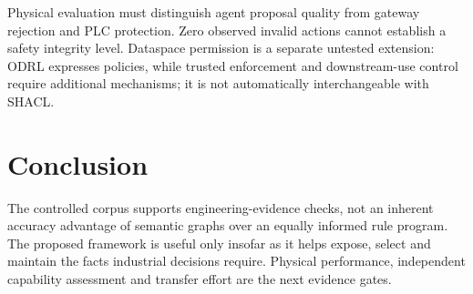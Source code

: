 \documentclass[10pt,journal,letterpaper]{IEEEtran}
\begin{document}
Physical evaluation must distinguish agent proposal quality from gateway rejection
and PLC protection. Zero observed invalid actions cannot establish a safety
integrity level. Dataspace permission is a separate untested extension: ODRL
expresses policies, while trusted enforcement and downstream-use control require
additional mechanisms; it is not automatically interchangeable with SHACL.

\section{Conclusion}
The controlled corpus supports engineering-evidence checks, not an inherent
accuracy advantage of semantic graphs over an equally informed rule program.
The proposed framework is useful only insofar as it helps expose, select and
maintain the facts industrial decisions require. Physical performance, independent
capability assessment and transfer effort are the next evidence gates.



\end{document}
